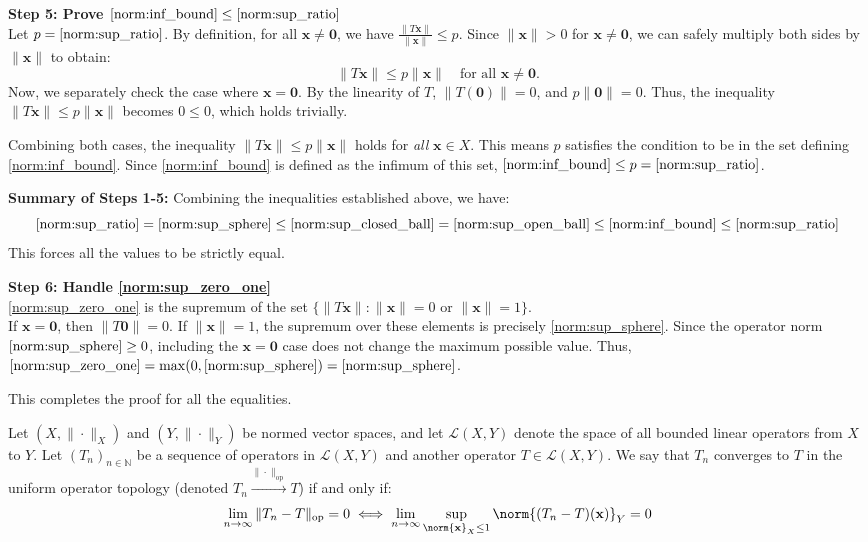 \begin{pfbox}
\textbf{Step 5: Prove $\eqref{norm:inf_bound} \le \eqref{norm:sup_ratio}$} \\
Let $p = \eqref{norm:sup_ratio}$. By definition, for all $\mathbf{x} \neq \mathbf{0}$, we have $\frac{\|T\mathbf{x}\|}{\|\mathbf{x}\|} \le p$.
Since $\|\mathbf{x}\| > 0$ for $\mathbf{x} \neq \mathbf{0}$, we can safely multiply both sides by $\|\mathbf{x}\|$ to obtain:
\[ \|T\mathbf{x}\| \le p\|\mathbf{x}\| \quad \text{for all } \mathbf{x} \neq \mathbf{0}. \]
Now, we separately check the case where $\mathbf{x} = \mathbf{0}$. By the linearity of $T$, $\|T(\mathbf{0})\| = 0$, and $p\|\mathbf{0}\| = 0$. Thus, the inequality $\|T\mathbf{x}\| \le p\|\mathbf{x}\|$ becomes $0 \le 0$, which holds trivially.

Combining both cases, the inequality $\|T\mathbf{x}\| \le p\|\mathbf{x}\|$ holds for \textit{all} $\mathbf{x} \in X$.
This means $p$ satisfies the condition to be in the set defining \eqref{norm:inf_bound}. Since \eqref{norm:inf_bound} is defined as the infimum of this set, $\eqref{norm:inf_bound} \le p = \eqref{norm:sup_ratio}$.

\textbf{Summary of Steps 1-5:} 
Combining the inequalities established above, we have:
\[
\eqref{norm:sup_ratio} = \eqref{norm:sup_sphere} \le \eqref{norm:sup_closed_ball} = \eqref{norm:sup_open_ball} \le \eqref{norm:inf_bound} \le \eqref{norm:sup_ratio}
\]
This forces all the values to be strictly equal.

\textbf{Step 6: Handle \eqref{norm:sup_zero_one}} \\
\eqref{norm:sup_zero_one} is the supremum of the set $\{ \|T\mathbf{x}\| : \|\mathbf{x}\| = 0 \text{ or } \|\mathbf{x}\| = 1 \}$. \\
If $\mathbf{x} = \mathbf{0}$, then $\|T\mathbf{0}\| = 0$. If $\|\mathbf{x}\| = 1$, the supremum over these elements is precisely \eqref{norm:sup_sphere}. Since the operator norm $\eqref{norm:sup_sphere} \ge 0$, including the $\mathbf{x}=\mathbf{0}$ case does not change the maximum possible value. Thus, $\eqref{norm:sup_zero_one} = \max(0, \eqref{norm:sup_sphere}) = \eqref{norm:sup_sphere}$.

This completes the proof for all the equalities.
\end{pfbox}

\begin{definition}
Let $(X, \|\cdot\|_X)$ and $(Y, \|\cdot\|_Y)$ be normed vector spaces, and let $\mathcal{L}(X,Y)$ denote the space of all bounded linear operators from $X$ to $Y$.
Let $(T_n)_{n\in\mathbb{N}}$ be a sequence of operators in $\mathcal{L}(X,Y)$ and another operator $T\in \mathcal{L}(X,Y)$.
We say that $T_n$ converges to $T$ in the uniform operator topology (denoted $T_n \xrightarrow{\|\cdot\|_{\mathrm{op}}} T$) if and only if:
\[
\lim_{n \to \infty} \|T_n - T\|_{\mathrm{op}} = 0 \iff \lim_{n\to\infty} \sup_{\norm{\mathbf{x}}_X\le 1}\norm{(T_n-T)(\mathbf{x})}_Y = 0
\]
\end{definition}

